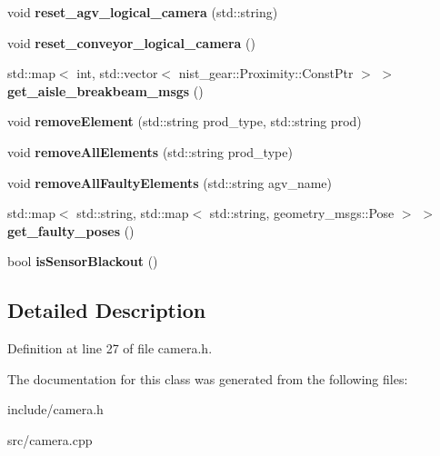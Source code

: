 \begin{DoxyCompactItemize}
\mbox{\label{classCamera_a36eeaa9398343397300f4443eaa850fd}} 
void {\bfseries reset\+\_\+agv\+\_\+logical\+\_\+camera} (std\+::string)
\item 
\mbox{\label{classCamera_a6a9d9df383cb10f5a49f95d14ff667ce}} 
void {\bfseries reset\+\_\+conveyor\+\_\+logical\+\_\+camera} ()
\item 
\mbox{\label{classCamera_a9fc24be02c7960fddc9c0ee9c29075c2}} 
std\+::map$<$ int, std\+::vector$<$ nist\+\_\+gear\+::\+Proximity\+::\+Const\+Ptr $>$ $>$ {\bfseries get\+\_\+aisle\+\_\+breakbeam\+\_\+msgs} ()
\item 
\mbox{\label{classCamera_a0a973d02f3be3fd71d86097c5d1222da}} 
void {\bfseries remove\+Element} (std\+::string prod\+\_\+type, std\+::string prod)
\item 
\mbox{\label{classCamera_a4acd7c3754e84c23194c98e5a2c2c9f0}} 
void {\bfseries remove\+All\+Elements} (std\+::string prod\+\_\+type)
\item 
\mbox{\label{classCamera_a90ccbc3963e356af6e41806141e3968c}} 
void {\bfseries remove\+All\+Faulty\+Elements} (std\+::string agv\+\_\+name)
\item 
\mbox{\label{classCamera_a1d297c0bbc586233739732a20d6230e3}} 
std\+::map$<$ std\+::string, std\+::map$<$ std\+::string, geometry\+\_\+msgs\+::\+Pose $>$ $>$ {\bfseries get\+\_\+faulty\+\_\+poses} ()
\item 
\mbox{\label{classCamera_a1f32f22408943c71045cb27ab8ac8a21}} 
bool {\bfseries is\+Sensor\+Blackout} ()
\end{DoxyCompactItemize}


\subsection{Detailed Description}


Definition at line 27 of file camera.\+h.



The documentation for this class was generated from the following files\+:\begin{DoxyCompactItemize}
\item 
include/camera.\+h\item 
src/camera.\+cpp\end{DoxyCompactItemize}
